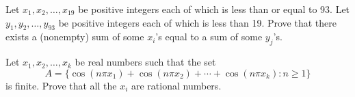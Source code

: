 \documentclass{article}
\begin{document}
\begin{exercise}[1993 A4]
    Let \(x_1,x_2,\dots,x_{19}\) be positive integers each of which is less than or equal to 93. 
    Let \(y_1,y_2,\dots,y_{93}\) be positive integers each of which is less than 19. 
    Prove that there exists a (nonempty) sum of some \(x_{i}\)'s equal to a sum of some \(y_j\)'s.
\end{exercise}

\begin{exercise}
    Let \(x_1,x_2,\dots,x_k\) be real numbers such that the set 
    \[A=\{\cos(n\pi x_1)+\cos(n\pi x_2)+\cdots+\cos(n\pi x_k) : n\geq 1\}\] 
    is finite. Prove that all the \(x_i\) are rational numbers.
\end{exercise}
\end{document}
